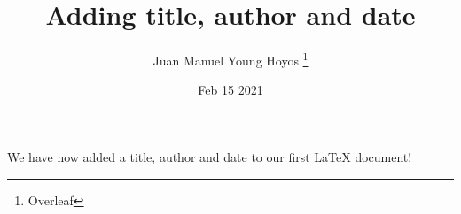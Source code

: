 \documentclass[12pt, letterpaper, twoside]{article}
\title{Adding title, author and date}
\author{Juan Manuel Young Hoyos \thanks{Overleaf}}
\date{Feb 15 2021}
\begin{document}
    \maketitle

    We have now added a title, author and date to our first \LaTeX{} document!

\end{document}
